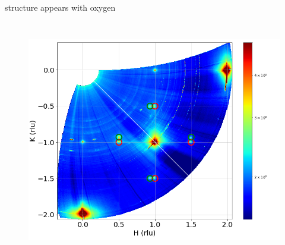 \begin{frame}{\ptthreeofour structure appears with oxygen}
\begin{columns}
    
    \begin{figure}
        \centering
        \includegraphics[trim=0 0 40 0, clip, width=\textwidth]{Figures/sxrd_data/maps/Map_hkl_surf_or_1596-1635.png}
        \label{fig:CondF1}
    \end{figure}

    \end{columns}

\end{frame}